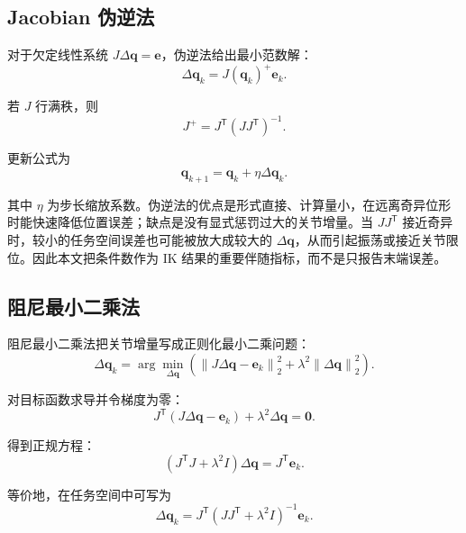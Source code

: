 \documentclass[UTF8,zihao=-4]{ctexart}
\newcommand{\norm}[1]{\left\lVert #1 \right\rVert}
\newcommand{\trans}{^{\mathsf T}}
\begin{document}
\subsection{Jacobian 伪逆法}
对于欠定线性系统 $J\Delta\bm q=\bm e$，伪逆法给出最小范数解\cite{buss2004ik}：
\begin{equation}
  \Delta\bm q_k=J(\bm q_k)^+\bm e_k .
  \label{eq:pinv-update}
\end{equation}

若 $J$ 行满秩，则
\begin{equation}
  J^+=J\trans(JJ\trans)^{-1}.
  \label{eq:pinv-form}
\end{equation}

更新公式为
\begin{equation}
  \bm q_{k+1}=\bm q_k+\eta\Delta\bm q_k .
  \label{eq:ik-update}
\end{equation}

其中 $\eta$ 为步长缩放系数。伪逆法的优点是形式直接、计算量小，在远离奇异位形时能快速降低位置误差；缺点是没有显式惩罚过大的关节增量。当 $JJ\trans$ 接近奇异时，较小的任务空间误差也可能被放大成较大的 $\Delta\bm q$，从而引起振荡或接近关节限位。因此本文把条件数作为 IK 结果的重要伴随指标，而不是只报告末端误差。

\subsection{阻尼最小二乘法}
阻尼最小二乘法把关节增量写成正则化最小二乘问题\cite{wampler1986dls,nakamura1986singularity}：
\begin{equation}
  \Delta\bm q_k
  =
  \arg\min_{\Delta\bm q}
  \left(
  \norm{J\Delta\bm q-\bm e_k}_2^2
  +
  \lambda^2\norm{\Delta\bm q}_2^2
  \right).
  \label{eq:dls-objective}
\end{equation}

对目标函数求导并令梯度为零：
\begin{equation}
  J\trans(J\Delta\bm q-\bm e_k)+\lambda^2\Delta\bm q=\bm 0 .
  \label{eq:dls-grad}
\end{equation}

得到正规方程：
\begin{equation}
  (J\trans J+\lambda^2I)\Delta\bm q=J\trans\bm e_k .
  \label{eq:dls-normal}
\end{equation}

等价地，在任务空间中可写为
\begin{equation}
  \Delta\bm q_k
  =
  J\trans(JJ\trans+\lambda^2I)^{-1}\bm e_k .
  \label{eq:dls-update}
\end{equation}
\end{document}

